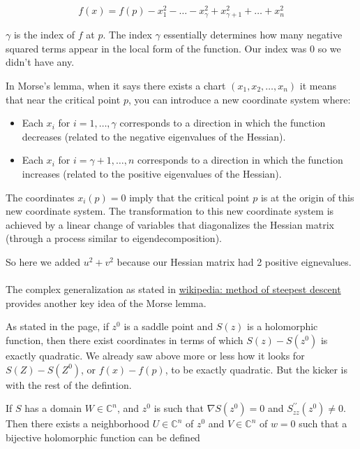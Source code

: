 $$
f(x) = f(p) - x_{1}^{2} - \ldots - x_{\gamma}^{2} + x_{\gamma +1}^{2} + \ldots + x_{n}^{2}
$$

$\gamma$ is the index of $f$ at $p$.
The index $\gamma$ essentially determines how many negative squared terms appear in the local form of the function.
Our index was 0 so we didn't have any.

In Morse's lemma, when it says there exists a chart $(x_1, x_2, \ldots , x_n)$
it means that near the critical point $p$, you can introduce a new coordinate system where:

\begin{itemize}
    \item Each $x_i$ for $i = 1, \ldots , \gamma$ corresponds to a direction in which the function decreases
        (related to the negative eigenvalues of the Hessian).
    \item Each $x_i$ for $i = \gamma +1, \ldots, n$ corresponds to a direction in which the function increases
        (related to the positive eigenvalues of the Hessian).
\end{itemize}

The coordinates $x_i (p) = 0$ imply that the critical point $p$ is at the origin of this new coordinate system.
The transformation to this new coordinate system is achieved by a linear change of variables that diagonalizes
the Hessian matrix (through a process similar to eigendecomposition).

So here we added $u^2 + v^2$ because our Hessian matrix had 2 positive eignevalues.
\\~\\



The complex generalization as stated in
\href{https://en.wikipedia.org/wiki/Method_of_steepest_descent#Complex_Morse_lemma}{wikipedia: method of steepest descent}
provides another key idea of the Morse lemma.

As stated in the page,
if $z^0$ is a saddle point and $S(z)$ is a holomorphic function, then there exist coordinates in terms
of which $S(z) - S(z^0)$ is exactly quadratic.
We already saw above more or less how it looks for $S(Z) - S(Z^0)$, or $f(x) - f(p)$, to be exactly quadratic.
But the kicker is with the rest of the defintion.

If $S$ has a domain $W \in \mathbb{C}^n$, and $z^0$ is such that $\nabla S(z^0) = 0$ and
$S^{\prime\prime}_{zz} (z^0) \neq 0$.
Then there exists a neighborhood $U \in \mathbb{C}^n$ of $z^0$ and $V \in \mathbb{C}^n$ of $w=0$
such that a bijective holomorphic function can be defined


